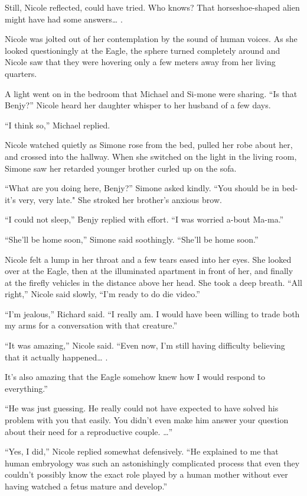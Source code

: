\documentclass[]{article}
\begin{document}
{Still, Nicole reflected, could have tried.  Who knows? That horseshoe-shaped alien might have had some answers… .

Nicole was jolted out of her contemplation by the sound of human voices.  As she looked questioningly at the Eagle, the sphere turned completely around and Nicole saw that they were hovering only a few meters away from her living quarters.

A light went on in the bedroom that Michael and Si-mone were sharing.  “Is that Benjy?” Nicole heard her daughter whisper to her husband of a few days.

“I think so,” Michael replied.

Nicole watched quietly as Simone rose from the bed, pulled her robe about her, and crossed into the hallway.  When she switched on the light in the living room, Simone saw her retarded younger brother curled up on the sofa.

“What are you doing here, Benjy?” Simone asked kindly.  “You should be in bed-it’s very, very late."  She stroked her brother’s anxious brow.

“I could not sleep,” Benjy replied with effort.  “I was worried a-bout Ma-ma.”

“She’ll be home soon,” Simone said soothingly.  “She’ll be home soon.”

Nicole felt a lump in her throat and a few tears eased into her eyes.  She looked over at the Eagle, then at the illuminated apartment in front of her, and finally at the firefly vehicles in the distance above her head.  She took a deep breath.  “All right,” Nicole said slowly, “I’m ready to do die video.”

“I’m jealous,” Richard said.  “I really am.  I would have been willing to trade both my arms for a conversation with that creature.”

“It was amazing,” Nicole said.  “Even now, I’m still having difficulty believing that it actually happened… .

It’s also amazing that the Eagle somehow knew how I would respond to everything.”

“He was just guessing.  He really could not have expected to have solved his problem with you that easily.  You didn’t even make him answer your question about their need for a reproductive couple.  …”

“Yes, I did,” Nicole replied somewhat defensively.  “He explained to me that human embryology was such an astonishingly complicated process that even they couldn’t possibly know the exact role played by a human mother without ever having watched a fetus mature and develop.”

}
\end{document}
